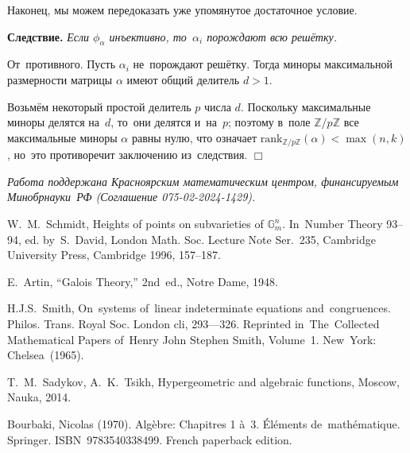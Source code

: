 \documentclass[twoside]{article}
\begin{document}
Наконец, мы можем передоказать уже упомянутое достаточное условие.

\medskip\noindent\textbf{Следствие.}\emph{
    Если $\phi_\alpha$ инъективно, то~$\alpha_i$ порождают всю решётку.
}\medskip

    От~противного. Пусть $\alpha_i$ не~порождают решётку. Тогда миноры максимальной размерности
    матрицы $\alpha$ имеют общий делитель $d > 1$.

    Возьмём некоторый простой делитель $p$ числа $d$. Поскольку максимальные миноры
    делятся на~$d$, то~они делятся и~на~$p$; поэтому в~поле $\mathbb{Z} / p \mathbb{Z}$
    все максимальные миноры $\alpha$ равны нулю, что означает $\mathrm{rank}_{\mathbb{Z} / p \mathbb{Z}}(\alpha) < \max(n, k)$ \cite{Brbk70},
    но~это противоречит заключению из~следствия.
\hfill$\Box$



\medskip


\emph{ Работа поддержана Красноярским математическим центром,
финансируемым Минобрнауки РФ (Соглашение 075-02-2024-1429). }



\bigskip




\begin{thebibliography}{9}

\label{Schm94}
W.~M.~Schmidt, Heights of points on subvarieties of $\mathbb{G}^n_m$.
In~Number Theory 93–94, ed. by~S.~David, London Math. Soc. Lecture Note Ser.~235,
Cambridge University Press, Cambridge 1996, 157–187.

\label{Art48}
E.~Artin, “Galois Theory,” 2nd~ed., Notre Dame, 1948.

\label{Smith60}
H.J.S.~Smith, On~systems of~linear indeterminate equations and~congruences. Philos. Trans. Royal
Soc. London cli, 293—326. Reprinted in~The~Collected Mathematical Papers of~Henry John Stephen Smith,
Volume~1. New~York: Chelsea~(1965).

\label{TsikhSad14}
T.~M.~Sadykov, A.~K.~Tsikh, Hypergeometric and algebraic functions, Moscow, Nauka, 2014.

\label{Brbk70}
Bourbaki, Nicolas (1970). Algèbre: Chapitres 1 à~3. Éléments de~mathématique. Springer. ISBN~9783540338499. French paperback edition.


\end{thebibliography}



\makeEngTit   %
\end{document}
